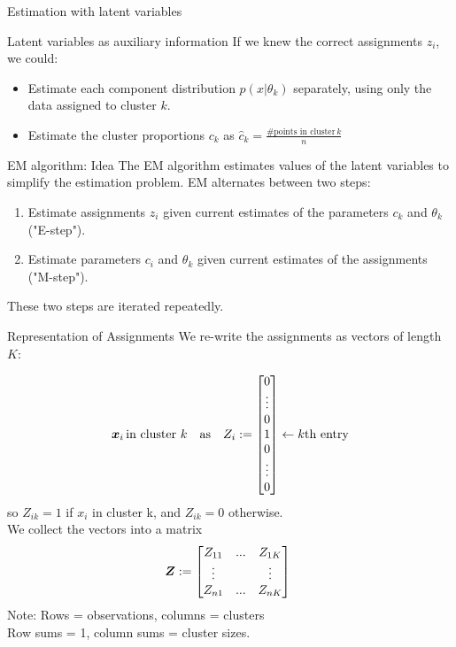\documentclass[10pt]{beamer}
\newcommand{\assign}{z} %
\newcommand{\Assign}{Z}
\begin{document}
\begin{frame}{Estimation with latent variables}

\begin{sblock}{Latent variables as auxiliary information}
If we knew the correct assignments $\assign_i$, we could:
\begin{itemize}
\item Estimate each component distribution $p(x|\theta_k)$ separately, using only the data assigned to cluster $k$.
\item Estimate the cluster proportions $c_k$ as $\widehat{c}_k = \frac{\text{\# points in cluster} \, k}{n}$
\end{itemize}

\end{sblock}
\begin{sblock}{EM algorithm: Idea}
The EM algorithm estimates values of the latent variables to simplify the estimation problem. EM alternates between two steps:
\begin{enumerate}
\item Estimate assignments $\assign_i$  given current estimates of the parameters $c_k$ and $\theta_k$ ("E-step").
\item Estimate parameters $c_i$ and $\theta_k$ given current estimates of the assignments ("M-step").
\end{enumerate}

These two steps are iterated repeatedly.
\end{sblock}
\end{frame}


\begin{frame}{Representation of Assignments}
\footnotesize
We re-write the assignments as vectors of length $K$:

\[ \+x_i \, \text{in cluster } k \quad \text{as} \quad \Assign_i := 
\begin{bmatrix}
0  \\
\vdots  \\
0  \\
1 \\
0  \\
\vdots  \\
0 
\end{bmatrix} \leftarrow k\text{th entry}
 \]
 so $\Assign_{ik}=1$ if $x_i$ in cluster k, and $\Assign_{ik} =0$ otherwise. \\
 \vfill
 We collect the vectors into a matrix
 \[ 
 \+\Assign := 
\begin{bmatrix}
\Assign_{11} & ... &  \Assign_{1K}\\
\vdots & & \vdots \\
\Assign_{n1} & ... &  \Assign_{nK}\\
\end{bmatrix} \
 \]
Note: Rows = observations, columns = clusters \\
Row sums = 1, column sums = cluster sizes.
\end{frame}
\end{document}
